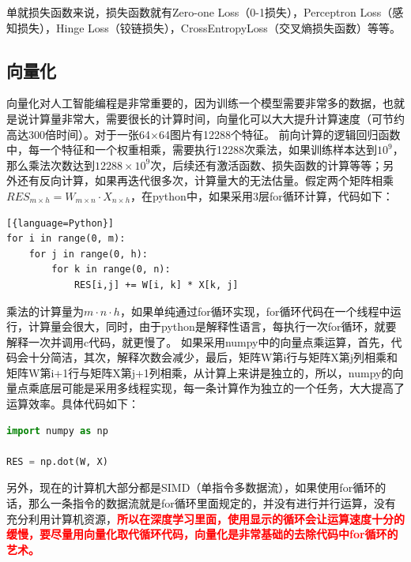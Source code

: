 单就损失函数来说，损失函数就有Zero-one Loss（0-1损失），Perceptron Loss（感知损失），Hinge Loss（铰链损失），CrossEntropyLoss（交叉熵损失函数）等等。

\subsection{向量化}
向量化对人工智能编程是非常重要的，因为训练一个模型需要非常多的数据，也就是说计算量非常大，需要很长的计算时间，向量化可以大大提升计算速度（可节约高达300倍时间）。对于一张64$\times$64图片有12288个特征。
前向计算的逻辑回归函数中，每一个特征和一个权重相乘，需要执行12288次乘法，如果训练样本达到$10^9$，那么乘法次数达到$12288\times 10^9$次，后续还有激活函数、损失函数的计算等等；另外还有反向计算，如果再迭代很多次，计算量大的无法估量。假定两个矩阵相乘$RES_{m\times h} = W_{m\times n}\cdot X_{n\times h}$，在python中，如果采用3层for循环计算，代码如下：
\begin{lstlisting}[{language=Python}]
for i in range(0, m):
	for j in range(0, h):
		for k in range(0, n):
			RES[i,j] += W[i, k] * X[k, j]	
\end{lstlisting}

乘法的计算量为$m\cdot n \cdot h$，如果单纯通过for循环实现，for循环代码在一个线程中运行，计算量会很大，同时，由于python是解释性语言，每执行一次for循环，就要解释一次并调用c代码，就更慢了。
如果采用numpy中的向量点乘运算，首先，代码会十分简洁，其次，解释次数会减少，最后，矩阵W第i行与矩阵X第j列相乘和矩阵W第i+1行与矩阵X第j+1列相乘，从计算上来讲是独立的，所以，numpy的向量点乘底层可能是采用多线程实现，每一条计算作为独立的一个任务，大大提高了运算效率。具体代码如下：
\begin{lstlisting}[language=Python]
import numpy as np

RES = np.dot(W, X)
\end{lstlisting}

另外，现在的计算机大部分都是SIMD（单指令多数据流），如果使用for循环的话，那么一条指令的数据流就是for循环里面规定的，并没有进行并行运算，没有充分利用计算机资源，\textcolor{red}{\textbf{所以在深度学习里面，使用显示的循环会让运算速度十分的缓慢，要尽量用向量化取代循环代码，向量化是非常基础的去除代码中for循环的艺术。}}

